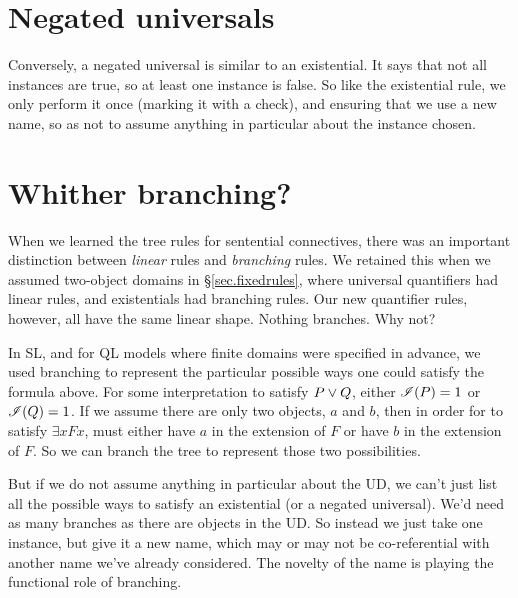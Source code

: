 \section{Negated universals}

Conversely, a negated universal is similar to an existential. It says that not all instances are true, so at least one instance is false. So like the existential rule, we only perform it once (marking it with a check), and ensuring that we use a new name, so as not to assume anything in particular about the instance chosen.

\label{negunrule}

\section{Whither branching?}

When we learned the tree rules for sentential connectives, there was an important distinction between \emph{linear} rules and \emph{branching} rules. We retained this when we assumed two-object domains in \S\ref{sec.fixedrules}, where universal quantifiers had linear rules, and existentials had branching rules. Our new quantifier rules, however, all have the same linear shape. Nothing branches. Why not?

In SL, and for QL models where finite domains were specified in advance, we used branching to represent the particular possible ways one could satisfy the formula above. For some interpretation  to satisfy $P \vee Q$, either $\mathscr{I}(P)=1$ or $\mathscr{I}(Q)=1$. If we assume there are only two objects, $a$ and $b$, then in order for  to satisfy $\exists x Fx$,  must either have $a$ in the extension of $F$ or have $b$ in the extension of $F$. So we can branch the tree to represent those two possibilities.

But if we do not assume anything in particular about the UD, we can't just list all the possible ways to satisfy an existential (or a negated universal). We'd need as many branches as there are objects in the UD. So instead we just take one instance, but give it a new name, which may or may not be co-referential with another name we've already considered. The novelty of the name is playing the functional role of branching.


